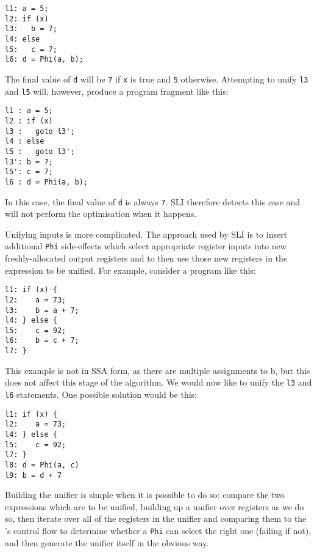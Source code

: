\begin{verbatim}
l1: a = 5;
l2: if (x)
l3:   b = 7;
l4: else
l5:   c = 7;
l6: d = Phi(a, b);
\end{verbatim}

The final value of \verb|d| will be \verb|7| if \verb|x| is true and
\verb|5| otherwise.  Attempting to unify \verb|l3| and \verb|l5| will,
however, produce a program fragment like this:

\begin{verbatim}
l1 : a = 5;
l2 : if (x)
l3 :   goto l3';
l4 : else
l5 :   goto l3';
l3': b = 7;
l5': c = 7;
l6 : d = Phi(a, b);
\end{verbatim}

In this case, the final value of \verb|d| is always \verb|7|.  SLI
therefore detects this case and will not perform the optimisation when
it happens.

Unifying inputs is more complicated.  The approach used by SLI is to
insert additional \verb|Phi| side-effects which select appropriate
register inputs into new freshly-allocated output registers and to
then use those new registers in the expression to be unified.  For
example, consider a program like this:

\begin{verbatim}
l1: if (x) {
l2:    a = 73;
l3:    b = a + 7;
l4: } else {
l5:    c = 92;
l6:    b = c + 7;
l7: }
\end{verbatim}

This example is not in SSA form, as there are multiple assignments to
b, but this does not affect this stage of the algorithm.  We would now like to unify the \verb|l3| and
\verb|l6| statements.  One possible solution would be this:

\begin{verbatim}
l1: if (x) {
l2:    a = 73;
l4: } else {
l5:    c = 92;
l7: }
l8: d = Phi(a, c)
l9: b = d + 7
\end{verbatim}

Building the unifier is simple when it is possible to do so: compare
the two expressions which are to be unified, building up a unifier
over registers as we do so, then iterate over all of the registers in
the unifier and comparing them to the \StateMachine's control flow to
determine whether a \verb|Phi| can select the right one (failing if
not), and then generate the unifier itself in the obvious way.


